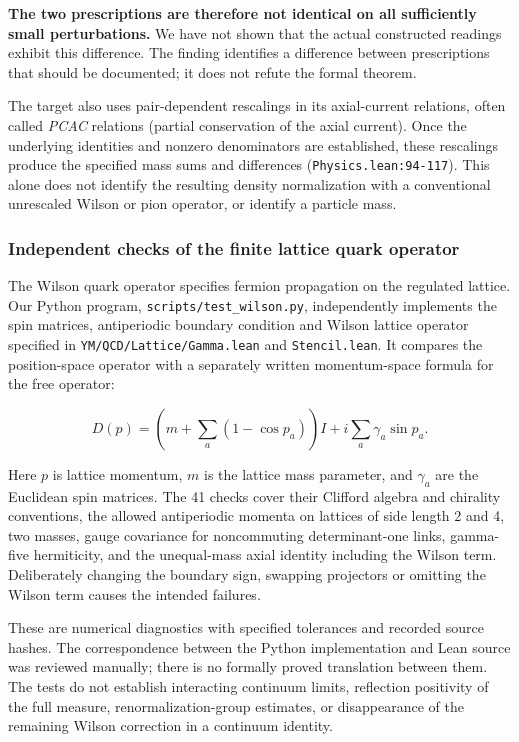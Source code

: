 \documentclass[
  11pt,
]{article}
\begin{document}
\textbf{The two prescriptions are therefore not identical on all
sufficiently small perturbations.} We have not shown that the actual
constructed readings exhibit this difference. The finding identifies a
difference between prescriptions that should be documented; it does not
refute the formal theorem.

The target also uses pair-dependent rescalings in its axial-current
relations, often called \emph{PCAC} relations (partial conservation of
the axial current). Once the underlying identities and nonzero
denominators are established, these rescalings produce the specified
mass sums and differences ({\small \nolinkurl{Physics.lean:94-117}}).
This alone does not identify the resulting density normalization with a
conventional unrescaled Wilson or pion operator, or identify a particle
mass.

\subsubsection{Independent checks of the finite lattice quark
operator}\label{independent-checks-of-the-finite-lattice-quark-operator}

The Wilson quark operator specifies fermion propagation on the regulated
lattice. Our Python program,
{\small \nolinkurl{scripts/test_wilson.py}}, independently implements
the spin matrices, antiperiodic boundary condition and Wilson lattice
operator specified in {\small \nolinkurl{YM/QCD/Lattice/Gamma.lean}} and
{\small \nolinkurl{Stencil.lean}}. It compares the position-space
operator with a separately written momentum-space formula for the free
operator:

\[
 D(p)=\left(m+\sum_a(1-\cos p_a)\right)I+i\sum_a\gamma_a\sin p_a.
\]

Here \(p\) is lattice momentum, \(m\) is the lattice mass parameter, and
\(\gamma_a\) are the Euclidean spin matrices. The 41 checks cover their
Clifford algebra and chirality conventions, the allowed antiperiodic
momenta on lattices of side length 2 and 4, two masses, gauge covariance
for noncommuting determinant-one links, gamma-five hermiticity, and the
unequal-mass axial identity including the Wilson term. Deliberately
changing the boundary sign, swapping projectors or omitting the Wilson
term causes the intended failures.

These are numerical diagnostics with specified tolerances and recorded
source hashes. The correspondence between the Python implementation and
Lean source was reviewed manually; there is no formally proved
translation between them. The tests do not establish interacting
continuum limits, reflection positivity of the full measure,
renormalization-group estimates, or disappearance of the remaining
Wilson correction in a continuum identity.
\end{document}
